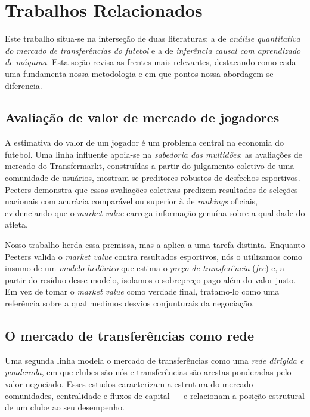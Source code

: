 \section{Trabalhos Relacionados}

Este trabalho situa-se na interseção de duas literaturas: a de \textit{análise quantitativa do
mercado de transferências do futebol} e a de \textit{inferência causal com aprendizado de máquina}.
Esta seção revisa as frentes mais relevantes, destacando como cada uma fundamenta nossa metodologia
e em que pontos nossa abordagem se diferencia.

\subsection{Avaliação de valor de mercado de jogadores}

A estimativa do valor de um jogador é um problema central na economia do futebol. Uma linha
influente apoia-se na \textit{sabedoria das multidões}: as avaliações de mercado do Transfermarkt,
construídas a partir do julgamento coletivo de uma comunidade de usuários, mostram-se preditores
robustos de desfechos esportivos. Peeters \cite{peeters2018} demonstra que essas avaliações coletivas
predizem resultados de seleções nacionais com acurácia comparável ou superior à de \textit{rankings}
oficiais, evidenciando que o \textit{market value} carrega informação genuína sobre a qualidade do
atleta.

Nosso trabalho herda essa premissa, mas a aplica a uma tarefa distinta. Enquanto Peeters
\cite{peeters2018} valida o \textit{market value} contra resultados esportivos, nós o utilizamos como insumo de um
\textit{modelo hedônico} que estima o \textit{preço de transferência} (\textit{fee}) e, a partir do
resíduo desse modelo, isolamos o sobrepreço pago além do valor justo. Em vez de tomar o
\textit{market value} como verdade final, tratamo-lo como uma referência sobre a qual medimos
desvios conjunturais da negociação.

\subsection{O mercado de transferências como rede}

Uma segunda linha modela o mercado de transferências como uma \textit{rede dirigida e ponderada},
em que clubes são nós e transferências são arestas ponderadas pelo valor negociado. Esses estudos
caracterizam a estrutura do mercado — comunidades, centralidade e fluxos de capital — e relacionam a
posição estrutural de um clube ao seu desempenho.

